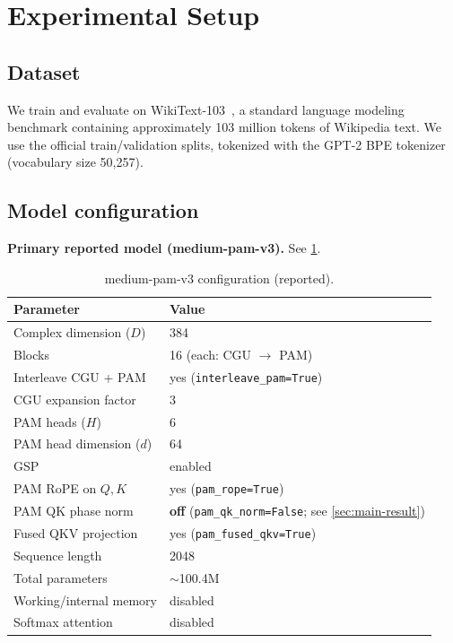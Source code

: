 \documentclass[11pt]{article}
\begin{document}
\section{Experimental Setup}
\label{sec:exp}

\subsection{Dataset}
We train and evaluate on WikiText-103~\cite{merity2017pointer}, a standard language modeling benchmark containing approximately 103 million tokens of Wikipedia text. We use the official train/validation splits, tokenized with the GPT-2 BPE tokenizer (vocabulary size 50,257).

\subsection{Model configuration}
\textbf{Primary reported model (medium-pam-v3).} See \cref{tab:config}.

\begin{table}[t]
  \centering
  \caption{medium-pam-v3 configuration (reported).}
  \label{tab:config}
  \begin{tabular}{@{}ll@{}}
    \toprule
    Parameter & Value \\
    \midrule
    Complex dimension ($D$) & 384 \\
    Blocks & 16 (each: CGU $\to$ PAM) \\
    Interleave CGU + PAM & yes (\texttt{interleave\_pam=True}) \\
    CGU expansion factor & 3 \\
    PAM heads ($H$) & 6 \\
    PAM head dimension ($d$) & 64 \\
    GSP & enabled \\
    PAM RoPE on $Q, K$ & yes (\texttt{pam\_rope=True}) \\
    PAM QK phase norm & \textbf{off} (\texttt{pam\_qk\_norm=False}; see \cref{sec:main-result}) \\
    Fused QKV projection & yes (\texttt{pam\_fused\_qkv=True}) \\
    Sequence length & 2048 \\
    Total parameters & $\sim$100.4M \\
    Working/internal memory & disabled \\
    Softmax attention & disabled \\
    \bottomrule
  \end{tabular}
\end{table}
\end{document}
